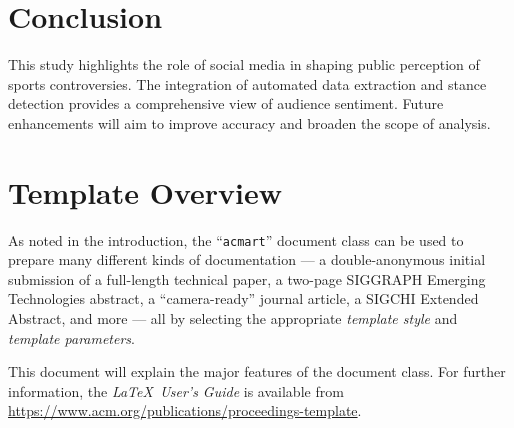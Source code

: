 \documentclass[sigconf, review]{acmart}
\begin{document}


\section{Conclusion}
This study highlights the role of social media in shaping public perception of sports controversies. The integration of automated data extraction and stance detection provides a comprehensive view of audience sentiment. Future enhancements will aim to improve accuracy and broaden the scope of analysis.


\section{Template Overview}
As noted in the introduction, the ``\verb|acmart|'' document class can
be used to prepare many different kinds of documentation --- a
double-anonymous initial submission of a full-length technical paper, a
two-page SIGGRAPH Emerging Technologies abstract, a ``camera-ready''
journal article, a SIGCHI Extended Abstract, and more --- all by
selecting the appropriate {\itshape template style} and {\itshape
  template parameters}.

This document will explain the major features of the document
class. For further information, the {\itshape \LaTeX\ User's Guide} is
available from
\url{https://www.acm.org/publications/proceedings-template}.
\end{document}
